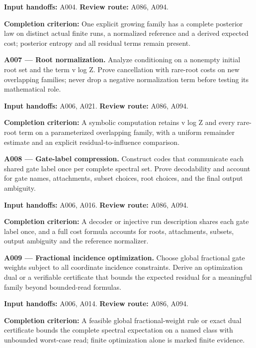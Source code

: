 \documentclass[11pt]{article}
\begin{document}
{\small\color{ink}\textbf{Input handoffs:} A004. \textbf{Review route:} A086, A094.\par
\textbf{Completion criterion:} One explicit growing family has a complete posterior law on distinct actual finite runs, a normalized reference and a derived expected cost; posterior entropy and all residual terms remain present.\par}



\textbf{A007 --- Root normalization.} Analyze conditioning on a nonempty initial root set and the term v log Z. Prove cancellation with rare-root costs on new overlapping families; never drop a negative normalization term before testing its mathematical role.

{\small\color{ink}\textbf{Input handoffs:} A006, A021. \textbf{Review route:} A086, A094.\par
\textbf{Completion criterion:} A symbolic computation retains v log Z and every rare-root term on a parameterized overlapping family, with a uniform remainder estimate and an explicit residual-to-influence comparison.\par}



\textbf{A008 --- Gate-label compression.} Construct codes that communicate each shared gate label once per complete spectral set. Prove decodability and account for gate names, attachments, subset choices, root choices, and the final output ambiguity.

{\small\color{ink}\textbf{Input handoffs:} A006, A016. \textbf{Review route:} A086, A094.\par
\textbf{Completion criterion:} A decoder or injective run description shares each gate label once, and a full cost formula accounts for roots, attachments, subsets, output ambiguity and the reference normalizer.\par}



\textbf{A009 --- Fractional incidence optimization.} Choose global fractional gate weights subject to all coordinate incidence constraints. Derive an optimization dual or a verifiable certificate that bounds the expected residual for a meaningful family beyond bounded-read formulas.

{\small\color{ink}\textbf{Input handoffs:} A006, A014. \textbf{Review route:} A086, A094.\par
\textbf{Completion criterion:} A feasible global fractional-weight rule or exact dual certificate bounds the complete spectral expectation on a named class with unbounded worst-case read; finite optimization alone is marked finite evidence.\par}
\end{document}
